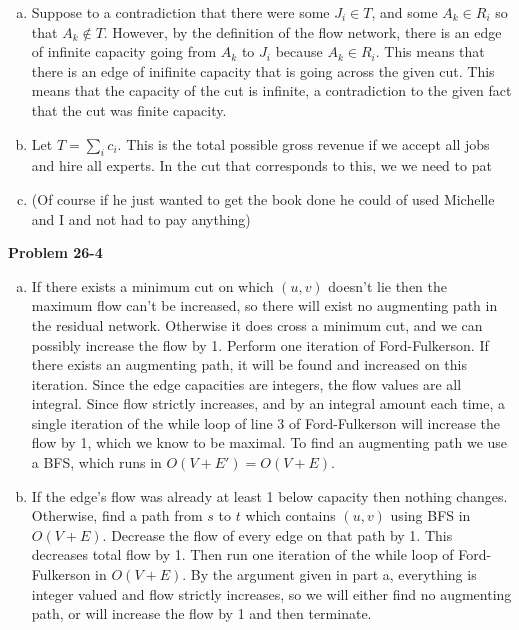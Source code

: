 \documentclass{article}
\begin{document}
\begin{enumerate}[a.]
\item
Suppose to a contradiction that there were some $J_i\in T$, and some $A_k\in R_i$ so that $A_k \not \in T$. However, by the definition of the flow network, there is an edge of infinite capacity going from $A_k$ to $J_i$ because $A_k \in R_i$. This means that there is an edge of inifinite capacity that is going across the given cut. This means that the capacity of the cut is infinite, a contradiction to the given fact that the cut was finite capacity.
\item
Let $T = \sum_i c_i$. This is the total possible gross revenue if we accept all jobs and hire all experts. In the cut that corresponds to this, we we need to pat %
\item%

(Of course if he just wanted to get the book done he could of used Michelle and I and not had to pay anything)
\end{enumerate}

\noindent\textbf{Problem 26-4}\\

\begin{enumerate}[a.]
\item If there exists a minimum cut on which $(u,v)$ doesn't lie then the maximum flow can't be increased, so there will exist no augmenting path in the residual network.  Otherwise it does cross a minimum cut, and we can possibly increase the flow by 1.   Perform one iteration of Ford-Fulkerson.  If there exists an augmenting path, it will be found and increased on this iteration.  Since the edge capacities are integers, the flow values are all integral.  Since flow strictly increases, and by an integral amount each time, a single iteration of the while loop of line 3 of Ford-Fulkerson will increase the flow by 1, which we know to be maximal.  To find an augmenting path we use a BFS, which runs in $O(V+E') = O(V+E)$. 

\item If the edge's flow was already at least 1 below capacity then nothing changes.  Otherwise, find a path from $s$ to $t$ which contains $(u,v)$ using BFS in $O(V+E)$.  Decrease the flow of every edge on that path by 1.  This decreases total flow by 1.  Then run one iteration of the while loop of Ford-Fulkerson in $O(V+E)$.  By the argument given in part a, everything is integer valued and flow strictly increases, so we will either find no augmenting path, or will increase the flow by 1 and then terminate. 
\end{enumerate} 
\end{document}
